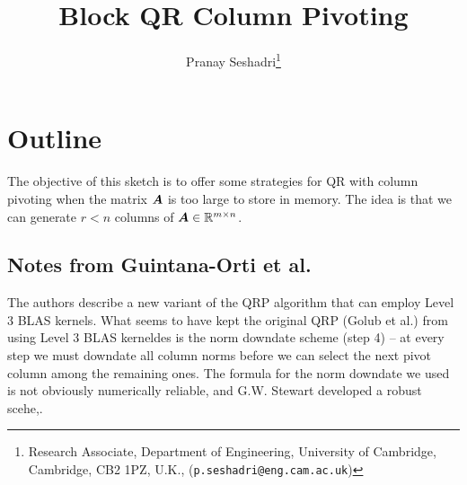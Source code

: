 \documentclass[final]{siamart0216}
\title{Block QR Column Pivoting}
\author{Pranay Seshadri\thanks{Research Associate, Department of Engineering, University of Cambridge, Cambridge, CB2 1PZ, U.K., (\texttt{p.seshadri@eng.cam.ac.uk})}   }
\newcommand{\BibTeX}{{\scshape Bib}\TeX\xspace}
\begin{document}
\maketitle

%
%
%
%
%
%

\section{Outline}
The objective of this sketch is to offer some strategies for QR with column pivoting when the matrix $\bm{A}$ is too large to store in memory. The idea is that we can generate $r<n$ columns of $\bm{A} \in \mathbb{R}^{m \times n}$.  



\subsection{Notes from Guintana-Orti et al. }
The authors describe a new variant of the QRP algorithm that can employ Level 3 BLAS kernels. What seems to have kept the original QRP (Golub et al.) from using Level 3 BLAS kerneldes is the norm downdate scheme (step 4) -- at every step we must downdate all column norms before we can select the next pivot column among the remaining ones. The formula for the norm downdate we used is not obviously numerically reliable, and G.W. Stewart developed a robust scehe,. 
\end{document}
